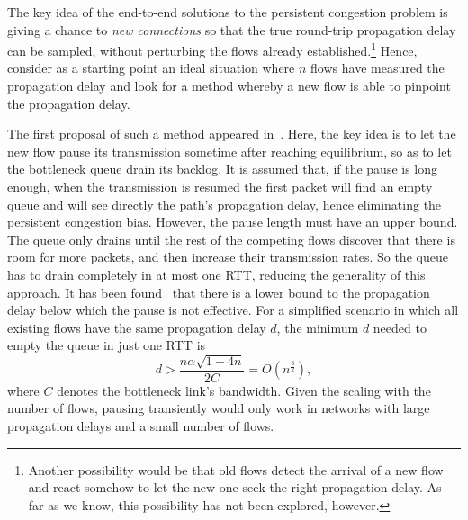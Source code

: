 \documentclass[english,times]{ettauth}
\begin{document}
The key idea of the end-to-end solutions to the persistent congestion problem
is giving a chance to \emph{new connections} so that the true round-trip
propagation delay can be sampled, without perturbing the flows already
established.\footnote{Another possibility would be that old flows detect the
  arrival of a new flow and react somehow to let the new one seek the right
  propagation delay. As far as we know, this possibility has not been
  explored, however.} Hence, consider as a starting point an ideal situation
where $n$ flows have measured the propagation delay and look for a method
whereby a new flow is able to pinpoint the propagation delay.

The first proposal of such a method appeared in~\cite{Cui06}. Here, the key
idea is to let the new flow pause its transmission sometime after reaching
equilibrium, so as to let the bottleneck queue drain its backlog. It is
assumed that, if the pause is long enough, when the transmission is resumed
the first packet will find an empty queue and will see directly the path's
propagation delay, hence eliminating the persistent congestion bias. However,
the pause length must have an upper bound. The queue only drains until the
rest of the competing flows discover that there is room for more packets, and
then increase their transmission rates. So the queue has to drain completely
in at most one RTT, reducing the generality of this approach. It has been
found~\cite{Rperez08b} that there is a lower bound to the propagation delay
below which the pause is not effective. For a simplified scenario in which all
existing flows have the same propagation delay $d$, the minimum $d$ needed to
empty the queue in just one RTT is
\begin{equation}
  \label{eq:pause-length-critique}
  d > \frac{n \alpha \sqrt{1 + 4n}}{2C} = O\left(n^{\frac{3}{2}} \right),
\end{equation}
where $C$ denotes the bottleneck link's bandwidth. Given the scaling with the
number of flows, pausing transiently would only work in networks with large
propagation delays and a small number of flows.
\end{document}
